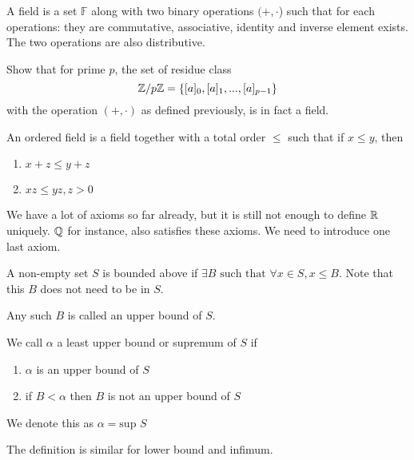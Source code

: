 \documentclass[11pt]{article}
\begin{document}
\begin{axiom}
  A field is a set \(\mathbb{F}\) along with two binary operations \((+, \cdot\)) such that for each operations: they are commutative, associative, identity and inverse element exists. The two operations are also distributive.
\end{axiom}

\begin{exercise}[\(\Z_p\) is a field]
  Show that for prime \(p\), the set of residue class \[\mathbb{Z}/p\mathbb{Z} = \{[a]_0, [a]_1,...,[a]_{p-1}\}\] with the operation \((+,\cdot)\) as defined previously, is in fact a field.
\end{exercise}
\begin{solution}
\end{solution}

\begin{axiom}
  An ordered field is a field together with a total order \(\leq\) such that if \(x \leq y\), then
  \begin{enumerate}[label={(O\arabic*)}]
    \item \(x+z \leq y+z\)
    \item \(xz \leq yz, z > 0\)
  \end{enumerate}
\end{axiom}

We have a lot of axioms so far already, but it is still not enough to define \(\mathbb{R}\) uniquely. \(\mathbb{Q}\) for instance, also satisfies these axioms. We need to introduce one last axiom.

\begin{definition}
  A non-empty set \(S\) is bounded above if \(\exists B \text{ such that } \forall x \in S, x \leq B\). Note that this \(B\) does not need to be in \(S\).

  Any such \(B\) is called an upper bound of \(S\).
\end{definition}
\begin{definition}[Supremum]
  We call \(\alpha\) a least upper bound or supremum of \(S\) if
  \begin{enumerate}
    \item \(\alpha\) is an upper bound of \(S\)
    \item if \(B<\alpha\) then \(B\) is not an upper bound of \(S\)
  \end{enumerate} 
  We denote this as \(\alpha = \text{sup } S\)
\end{definition}
The definition is similar for lower bound and infimum.
\end{document}
